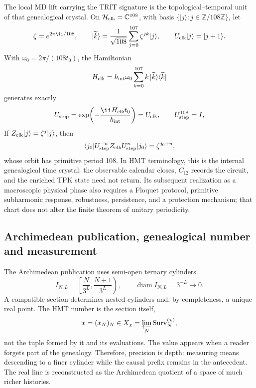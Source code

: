 {The local MD lift carrying the TRIT signature is the
topological--temporal unit of that genealogical crystal.
On
\(\mathcal H_{\rm clk}=\mathbb C^{108}\), with basis
\(\{|j\rangle:j\in\mathbb Z/108\mathbb Z\}\), let
\[
\zeta=e^{2\pi\ii/108},\qquad
|\widetilde k\rangle=\frac1{\sqrt{108}}
\sum_{j=0}^{107}\zeta^{jk}|j\rangle,
\qquad U_{\rm clk}|j\rangle=|j+1\rangle.
\]
With \(\omega_0=2\pi/(108t_0)\), the Hamiltonian
\begin{equation}
H_{\rm clk}=\hbar_{\rm int}\omega_0
\sum_{k=0}^{107}k\,|\widetilde k\rangle\langle\widetilde k|
\label{p12-83-c3-s1:eq:trit-time-crystal-hamiltonian}
\end{equation}
generates exactly
\begin{equation}
U_{\rm step}=\exp\!\left(
-\frac{\ii H_{\rm clk}t_0}{\hbar_{\rm int}}\right)=U_{\rm clk},
\qquad U_{\rm step}^{108}=I,
\label{p12-83-c3-s1:eq:trit-time-crystal-period}
\end{equation}
If \(Z_{\rm clk}|j\rangle=\zeta^j|j\rangle\), then
\begin{equation}
\langle j_0|U_{\rm step}^{-n}Z_{\rm clk}U_{\rm step}^{n}|j_0\rangle
=\zeta^{j_0+n},
\label{p12-83-c3-s1:eq:trit-time-crystal-observable}
\end{equation}
whose orbit has primitive period 108. In HMT terminology, this is the
internal genealogical time crystal: the observable calendar closes,
\(C_{12}\) records the circuit, and the enriched TPK state need not
return. Its subsequent realization as a macroscopic physical phase also requires
a Floquet protocol, primitive subharmonic response, robustness,
persistence, and a protection mechanism; that chart does not alter the finite
theorem of unitary periodicity.

\subsection{Archimedean publication, genealogical number and measurement}

The Archimedean publication uses semi-open ternary cylinders.
\begin{equation}
I_{N,L}=\left[\frac{N}{3^L},\frac{N+1}{3^L}\right),
\qquad \operatorname{diam}I_{N,L}=3^{-L}\longrightarrow0.
\label{p12-83-c3-s1:eq:ternary-cylinders}
\end{equation}
A compatible section determines nested cylinders and, by completeness, a
unique real point. The HMT number is the section itself,
\begin{equation}
x=(x_N)_N\in X_\chi
=\varprojlim_N\operatorname{Surv}^{(\chi)}_N,
\label{p12-83-c3-s1:eq:hmt-number-as-section}
\end{equation}
not the tuple formed by it and its evaluations. The value appears when a
reader forgets part of the genealogy.
Therefore, precision is depth: measuring means descending to a
finer cylinder while the causal prefix remains in the antecedent.
The real line is reconstructed as the Archimedean quotient of a space of
much richer histories.

}
